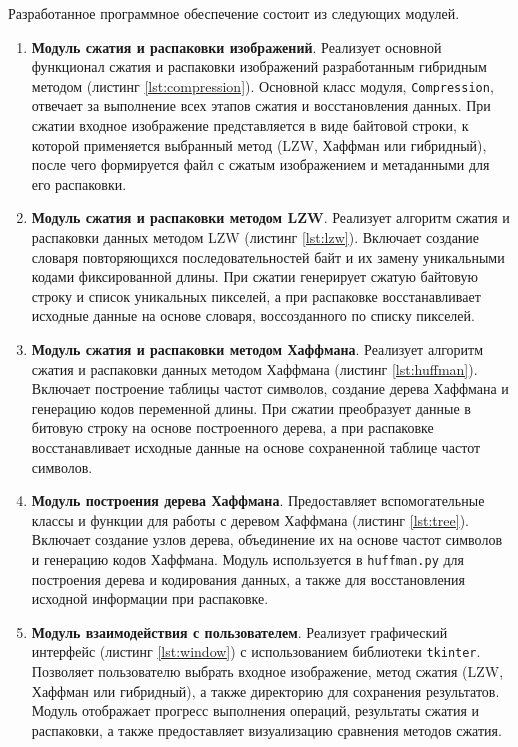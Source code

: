 Разработанное программное обеспечение состоит из следующих модулей.
\begin{enumerate}
    \item \textbf{Модуль сжатия и распаковки изображений}. Реализует основной функционал сжатия и распаковки изображений разработанным гибридным методом (листинг \ref{lst:compression}). Основной класс модуля, \texttt{Compression}, отвечает за выполнение всех этапов сжатия и восстановления данных. При сжатии входное изображение представляется в виде байтовой строки, к которой применяется выбранный метод (LZW, Хаффман или гибридный), после чего формируется файл с сжатым изображением и метаданными для его распаковки.
    \item \textbf{Модуль сжатия и распаковки методом LZW}. Реализует алгоритм сжатия и распаковки данных методом LZW (листинг \ref{lst:lzw}). Включает создание словаря повторяющихся последовательностей байт и их замену уникальными кодами фиксированной длины. При сжатии генерирует сжатую байтовую строку и список уникальных пикселей, а при распаковке восстанавливает исходные данные на основе словаря, воссозданного по списку пикселей.
    \item \textbf{Модуль сжатия и распаковки методом Хаффмана}. Реализует алгоритм сжатия и распаковки данных методом Хаффмана (листинг \ref{lst:huffman}). Включает построение таблицы частот символов, создание дерева Хаффмана и генерацию кодов переменной длины. При сжатии преобразует данные в битовую строку на основе построенного дерева, а при распаковке восстанавливает исходные данные на основе сохраненной таблице частот символов.
    \item \textbf{Модуль построения дерева Хаффмана}. Предоставляет вспомогательные классы и функции для работы с деревом Хаффмана (листинг \ref{lst:tree}). Включает создание узлов дерева, объединение их на основе частот символов и генерацию кодов Хаффмана. Модуль используется в \texttt{huffman.py} для построения дерева и кодирования данных, а также для восстановления исходной информации при распаковке.
    \item \textbf{Модуль взаимодействия с пользователем}. Реализует графический интерфейс (листинг \ref{lst:window}) с использованием библиотеки \texttt{tkinter}. Позволяет пользователю выбрать входное изображение, метод сжатия (LZW, Хаффман или гибридный), а также директорию для сохранения результатов. Модуль отображает прогресс выполнения операций, результаты сжатия и распаковки, а также предоставляет визуализацию сравнения методов сжатия.
\end{enumerate}

